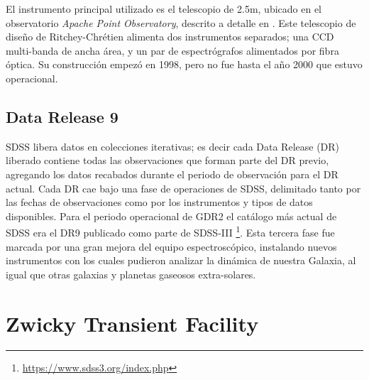 El instrumento principal utilizado es el telescopio de 2.5m, ubicado en el
observatorio \textit{Apache Point Observatory}, descrito a detalle en
. Este telescopio de diseño de Ritchey-Chrétien
alimenta dos instrumentos separados; una CCD multi-banda de ancha área, y un par
de espectrógrafos alimentados por fibra óptica. Su construcción empezó en 1998,
pero no fue hasta el año 2000 que estuvo operacional.

\subsection{Data Release 9}

SDSS libera datos en colecciones iterativas; es decir cada Data Release (DR)
liberado contiene todas las observaciones que forman parte del DR previo,
agregando los datos recabados durante el periodo de observación para el DR
actual. Cada DR cae bajo una fase de operaciones de SDSS, delimitado tanto por
las fechas de observaciones como por los instrumentos y tipos de datos
disponibles. Para el periodo operacional de GDR2 el catálogo más actual de SDSS 
era el DR9 publicado como parte de SDSS-III
\footnote{\url{https://www.sdss3.org/index.php}}. Esta tercera fase fue marcada
por una gran mejora del equipo espectroscópico, instalando nuevos instrumentos
con los cuales pudieron analizar la dinámica de nuestra Galaxia, al igual que
otras galaxias y planetas gaseosos extra-solares. 

\section{Zwicky Transient Facility}

